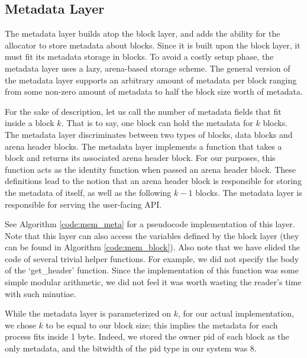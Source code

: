 \documentclass[12pt]{report}
\begin{document}
\subsection{Metadata Layer}
    The metadata layer builds atop the block layer, and adds the ability for the
    allocator to store metadata about blocks. Since it is built upon the block
    layer, it must fit its metadata storage in blocks. To avoid a costly setup
    phase, the metadata layer uses a lazy, arena-based storage scheme. The
    general version of the metadata layer supports an arbitrary amount of
    metadata per block ranging from some non-zero amount of metadata to half the
    block size worth of metadata.

    For the sake of description, let us call the number of metadata fields that
    fit inside a block $k$. That is to say, one block can hold the metadata for
    $k$ blocks. The metadata layer discriminates between two types of blocks,
    data blocks and arena header blocks. The metadata layer implements a
    function that takes a block and returns its associated arena header block.
    For our purposes, this function acts as the identity function when passed
    an arena header block. These definitions lead to the notion that an arena
    header block is responsible for storing the metadata of itself, as well as
    the following $k-1$ blocks. The metadata layer is responsible for serving
    the user-facing API.

    See Algorithm \ref{code:mem_meta} for a pseudocode implementation of this
    layer. Note that this layer can also access the variables defined by the
    block layer (they can be found in Algorithm \ref{code:mem_block}). Also note that we have elided the code of several trivial helper functions. For
    example, we did not specify the body of the `get\_header' function. Since
    the implementation of this function was some simple modular arithmetic, we
    did not feel it was worth wasting the reader's time with such minutiae.

    While the metadata layer is parameterized on $k$, for our actual
    implementation, we chose $k$ to be equal to our block size; this implies
    the metadata for each process fits inside 1 byte. Indeed, we stored the
    owner pid of each block as the only metadata, and the bitwidth of the pid
    type in our system was 8.
\end{document}
